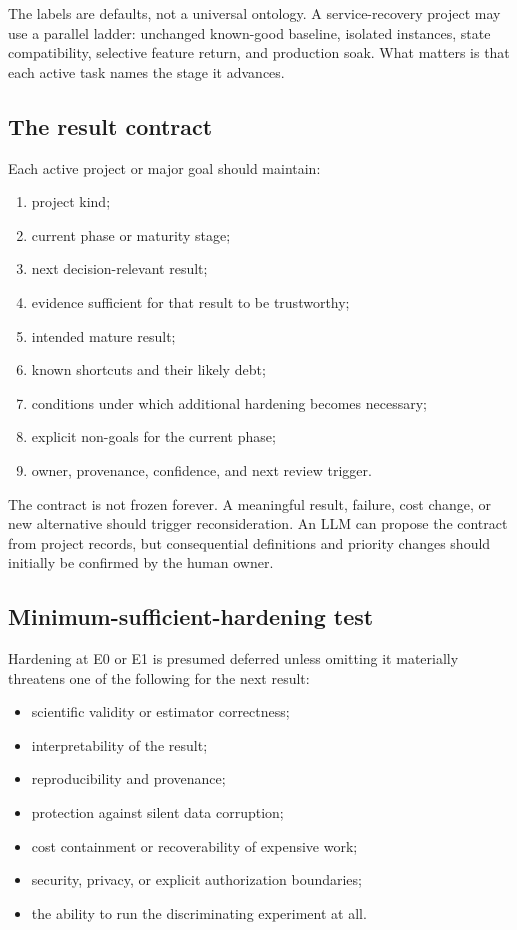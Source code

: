 \documentclass[11pt,letterpaper]{article}
\begin{document}
The labels are defaults, not a universal ontology. A service-recovery project
may use a parallel ladder: unchanged known-good baseline, isolated instances,
state compatibility, selective feature return, and production soak. What
matters is that each active task names the stage it advances.

\subsection{The result contract}

Each active project or major goal should maintain:

\begin{enumerate}
  \item project kind;
  \item current phase or maturity stage;
  \item next decision-relevant result;
  \item evidence sufficient for that result to be trustworthy;
  \item intended mature result;
  \item known shortcuts and their likely debt;
  \item conditions under which additional hardening becomes necessary;
  \item explicit non-goals for the current phase;
  \item owner, provenance, confidence, and next review trigger.
\end{enumerate}

The contract is not frozen forever. A meaningful result, failure, cost change,
or new alternative should trigger reconsideration. An LLM can propose the
contract from project records, but consequential definitions and priority
changes should initially be confirmed by the human owner.

\subsection{Minimum-sufficient-hardening test}

Hardening at E0 or E1 is presumed deferred unless omitting it materially
threatens one of the following for the next result:

\begin{itemize}
  \item scientific validity or estimator correctness;
  \item interpretability of the result;
  \item reproducibility and provenance;
  \item protection against silent data corruption;
  \item cost containment or recoverability of expensive work;
  \item security, privacy, or explicit authorization boundaries;
  \item the ability to run the discriminating experiment at all.
\end{itemize}
\end{document}

